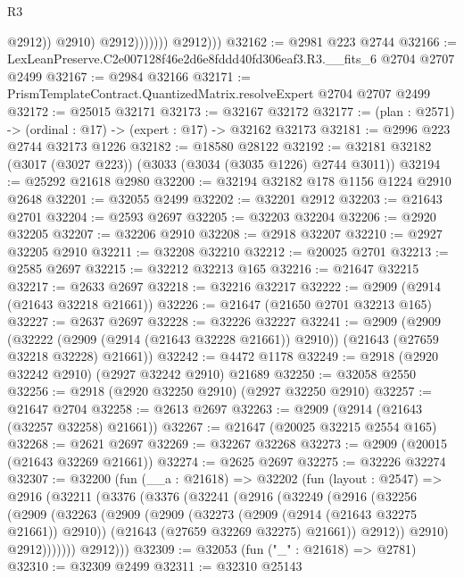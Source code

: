 \begin{lexlean}{R3}
\begin{coremodule}
                              @2912))
                          @2910)
                        @2912)))))))
          @2912)))
@32162 := @2981 @223 @2744
@32166 := LexLeanPreserve.C2e007128f46e2d6e8fddd40fd306eaf3.R3.__fits_6 @2704 @2707 @2499
@32167 := @2984 @32166
@32171 := PrismTemplateContract.QuantizedMatrix.resolveExpert @2704 @2707 @2499
@32172 := @25015 @32171
@32173 := @32167 @32172
@32177 := (plan : @2571) -> (ordinal : @17) -> (expert : @17) -> @32162 @32173
@32181 := @2996 @223 @2744 @32173 @1226
@32182 := @18580 @28122
@32192 := @32181 @32182 (@3017 (@3027 @223)) (@3033 (@3034 (@3035 @1226) @2744 @3011))
@32194 := @25292 @21618 @2980
@32200 := @32194 @32182 @178 @1156 @1224 @2910 @2648
@32201 := @32055 @2499
@32202 := @32201 @2912
@32203 := @21643 @2701
@32204 := @2593 @2697
@32205 := @32203 @32204
@32206 := @2920 @32205
@32207 := @32206 @2910
@32208 := @2918 @32207
@32210 := @2927 @32205 @2910
@32211 := @32208 @32210
@32212 := @20025 @2701
@32213 := @2585 @2697
@32215 := @32212 @32213 @165
@32216 := @21647 @32215
@32217 := @2633 @2697
@32218 := @32216 @32217
@32222 := @2909 (@2914 (@21643 @32218 @21661))
@32226 := @21647 (@21650 @2701 @32213 @165)
@32227 := @2637 @2697
@32228 := @32226 @32227
@32241 := @2909
    (@2909
      (@32222 (@2909 (@2914 (@21643 @32228 @21661)) @2910))
      (@21643 (@27659 @32218 @32228) @21661))
@32242 := @4472 @1178
@32249 := @2918 (@2920 @32242 @2910) (@2927 @32242 @2910) @21689
@32250 := @32058 @2550
@32256 := @2918 (@2920 @32250 @2910) (@2927 @32250 @2910)
@32257 := @21647 @2704
@32258 := @2613 @2697
@32263 := @2909 (@2914 (@21643 (@32257 @32258) @21661))
@32267 := @21647 (@20025 @32215 @2554 @165)
@32268 := @2621 @2697
@32269 := @32267 @32268
@32273 := @2909 (@20015 (@21643 @32269 @21661))
@32274 := @2625 @2697
@32275 := @32226 @32274
@32307 := @32200
    (fun (__a : @21618) =>
    @32202
      (fun (layout : @2547) =>
      @2916
        (@32211
          (@3376
            (@3376
              (@32241
                (@2916
                  (@32249
                    (@2916
                      (@32256
                        (@2909
                          (@32263
                            (@2909
                              (@2909
                                (@32273 (@2909 (@2914 (@21643 @32275 @21661)) @2910))
                                (@21643 (@27659 @32269 @32275) @21661))
                              @2912))
                          @2910)
                        @2912)))))))
          @2912)))
@32309 := @32053 (fun ("_" : @21618) => @2781)
@32310 := @32309 @2499
@32311 := @32310 @25143

\end{coremodule}
\end{lexlean}
